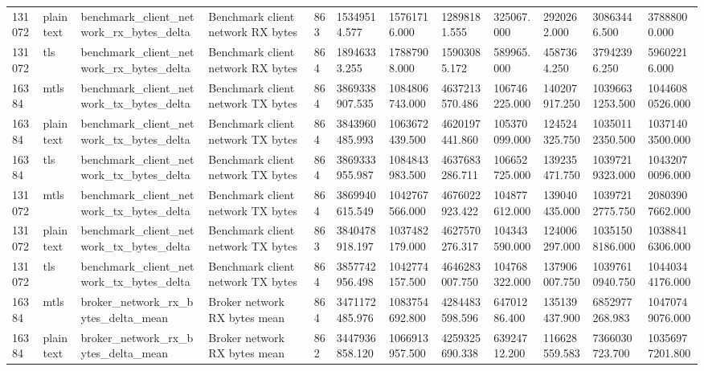 \begin{longtable}{llllllllllll}
131072 & plaintext & benchmark\_client\_network\_rx\_bytes\_delta & Benchmark client network RX bytes & 863 & 15349514.577 & 15761716.000 & 12898181.555 & 325067.000 & 2920262.000 & 30863446.500 & 37888000.000 \\
131072 & tls & benchmark\_client\_network\_rx\_bytes\_delta & Benchmark client network RX bytes & 864 & 18946333.255 & 17887908.000 & 15903085.172 & 589965.000 & 4587364.250 & 37942396.250 & 59602216.000 \\
16384 & mtls & benchmark\_client\_network\_tx\_bytes\_delta & Benchmark client network TX bytes & 864 & 3869338907.535 & 1084806743.000 & 4637213570.486 & 106746225.000 & 140207917.250 & 10396631253.500 & 10446080526.000 \\
16384 & plaintext & benchmark\_client\_network\_tx\_bytes\_delta & Benchmark client network TX bytes & 864 & 3843960485.993 & 1063672439.500 & 4620197441.860 & 105370099.000 & 124524325.750 & 10350112350.500 & 10371403500.000 \\
16384 & tls & benchmark\_client\_network\_tx\_bytes\_delta & Benchmark client network TX bytes & 864 & 3869333955.987 & 1084843983.500 & 4637683286.711 & 106652725.000 & 139235471.750 & 10397219323.000 & 10432070096.000 \\
131072 & mtls & benchmark\_client\_network\_tx\_bytes\_delta & Benchmark client network TX bytes & 864 & 3869940615.549 & 1042767566.000 & 4676022923.422 & 104877612.000 & 139040435.000 & 10397212775.750 & 20803907662.000 \\
131072 & plaintext & benchmark\_client\_network\_tx\_bytes\_delta & Benchmark client network TX bytes & 863 & 3840478918.197 & 1037482179.000 & 4627570276.317 & 104343590.000 & 124006297.000 & 10351508186.000 & 10388416306.000 \\
131072 & tls & benchmark\_client\_network\_tx\_bytes\_delta & Benchmark client network TX bytes & 864 & 3857742956.498 & 1042774157.500 & 4646283007.750 & 104768322.000 & 137906007.750 & 10397610940.750 & 10440344176.000 \\
16384 & mtls & broker\_network\_rx\_bytes\_delta\_mean & Broker network RX bytes mean & 864 & 3471172485.976 & 1083754692.800 & 4284483598.596 & 64701286.400 & 135139437.900 & 6852977268.983 & 10470749076.000 \\
16384 & plaintext & broker\_network\_rx\_bytes\_delta\_mean & Broker network RX bytes mean & 862 & 3447936858.120 & 1066913957.500 & 4259325690.338 & 63924712.200 & 116628559.583 & 7366030723.700 & 10356977201.800 \\

\end{longtable}
